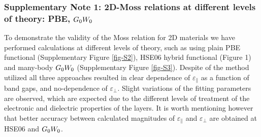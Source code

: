 \documentclass[journal=ancac3,manuscript=article,email=true,hyperref=true,keywords=true]{achemso}
\begin{document}


\pagebreak{}



%
%


\subsubsection{Supplementary Note 1: 2D-Moss relations at different levels of theory: PBE, $G_{\rm 0}W_{\rm 0}$}


To demonstrate the validity of the Moss relation for 2D materials we have performed calculations 
at different levels of theory, such as using plain PBE functional (Supplementary Figure \ref{fig-S2}), HSE06 hybrid functional (Figure 1) and many-body $G_{\rm 0}W_{\rm 0}$ (Supplementary Figure \ref{fig-S3}). Despite of the method utilized all three approaches resulted in clear dependence of $\varepsilon_{\parallel}$ as a 
function of band gaps, and no-dependence of $\varepsilon_{\perp}$. Slight variations of the fitting parameters are observed, which are expected due to the different levels of treatment of the electronic and dielectric properties of the layers. It is worth mentioning however that better accuracy between calculated magnitudes of $\varepsilon_{\parallel}$ and $\varepsilon_{\perp}$ 
are obtained at HSE06 and $G_{\rm 0}W_{\rm 0}$. 
\end{document}

